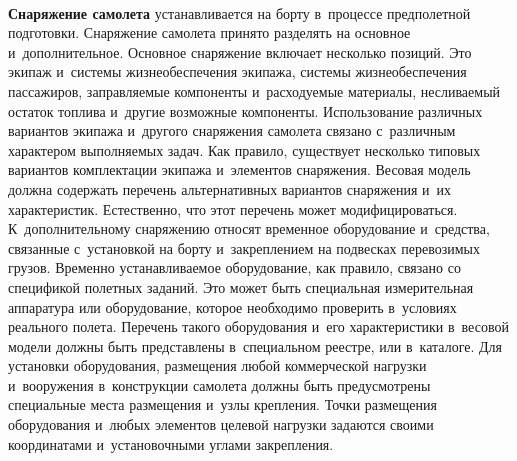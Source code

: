 \begin{multicols}{2}
\begin{figure*} %
\vspace*{1pt}
 \begin{center}
 \mbox{%
 \epsfxsize=162mm 
 }
 \end{center}
\vspace*{-9pt}
\end{figure*}
  
  \textbf{Снаряжение самолета} устанавливается на борту в~процессе 
предполетной подготовки. Снаряжение самолета принято разделять на 
основное и~дополнительное. Основное снаряжение включает несколько 
позиций. Это экипаж и~системы жизнеобеспечения экипажа, системы 
жизнеобеспечения пассажиров, заправляемые компоненты и~расходуемые 
материалы, несливаемый остаток топлива и~другие возможные компоненты. 
Использование различных вариантов экипажа и~другого снаряжения самолета 
связано с~различным характером выполняемых задач. Как правило, существует 
несколько типовых вариантов комплектации экипажа 
и~элементов снаряжения. Весовая модель должна содержать перечень 
альтернативных вариантов снаряжения и~их характеристик. Естественно, что 
этот перечень может модифицироваться. К~дополнительному снаряжению 
относят временное оборудование и~средства, связанные с~установкой на борту 
и~закреплением на подвесках перевозимых грузов. Временно устанавливаемое 
оборудование, как правило, связано со спецификой полетных заданий. Это 
может быть специальная измерительная аппаратура или оборудование, которое 
необходимо проверить в~условиях реального полета. Перечень такого 
оборудования и~его характеристики в~весовой модели должны быть 
пред\-став\-ле\-ны в~специальном реестре, или в~каталоге. Для установки 
оборудования, размещения любой коммерческой нагрузки и~вооружения в~конструкции самолета
должны быть  предусмотрены специальные места 
размещения и~узлы крепления. Точки размещения оборудования и~любых 
элементов целевой нагрузки задаются своими координатами и~установочными 
углами закрепления. 

\begin{figure*} %
  \vspace*{1pt}
 \begin{center}
 \mbox{%
 \epsfxsize=162mm 
 }
 \end{center}
\vspace*{-11pt}
\end{figure*}
  

\end{multicols}

